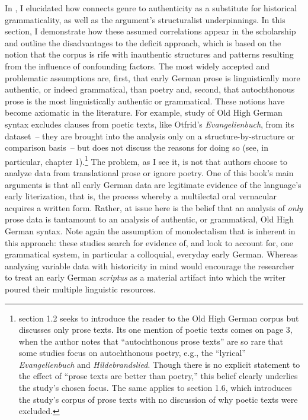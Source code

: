 In , I elucidated how \citet{Fleischer2006} connects genre to authenticity as a substitute for historical grammaticality, as well as the argument’s structuralist underpinnings. In this section, I demonstrate how these assumed correlations appear in the scholarship and outline the disadvantages to the deficit approach, which is based on the notion that the corpus is rife with inauthentic structures and patterns resulting from the influence of confounding factors. The most widely accepted and problematic assumptions are, first, that early German prose is linguistically more authentic, or indeed grammatical, than poetry and, second, that autochthonous prose is the most linguistically authentic or grammatical. These notions have become axiomatic in the literature. For example,  study of Old High German syntax excludes clauses from poetic texts, like Otfrid’s \textit{Evangelienbuch}, from its dataset~-- they are brought into the analysis only on a structure-by-structure or comparison basis~-- but does not discuss the reasons for doing so (see, in particular, chapter 1).\footnote{{ section 1.2 seeks to introduce the reader to the Old High German corpus but discusses only prose texts. Its one mention of poetic texts comes on page 3, when the author notes that “autochthonous prose texts” are so rare that some studies focus on autochthonous poetry, e.g., the “lyrical”} {\textit{Evangelienbuch}} {and} {\textit{Hildebrandslied}}{. Though there is no explicit statement to the effect of “prose texts are better than poetry,” this belief clearly underlies the study’s chosen focus. The same applies to section 1.6, which introduces the study’s corpus of prose texts with no discussion of why poetic texts were excluded.} } The problem, as I see it, is not that authors choose to analyze data from translational prose or ignore poetry. One of this book’s main arguments is that all early German data are legitimate evidence of the language’s early literization, that is, the process whereby a multilectal oral vernacular acquires a written form. Rather, at issue here is the belief that an analysis of \textit{only} prose data is tantamount to an analysis of authentic, or grammatical, Old High German syntax. Note again the assumption of monolectalism that is inherent in this approach: these studies search for evidence of, and look to account for, one grammatical system, in particular a colloquial, everyday early German. Whereas analyzing variable data with historicity in mind would encourage the researcher to treat an early German \textit{scriptus} as a material artifact into which the writer poured their multiple linguistic resources.

